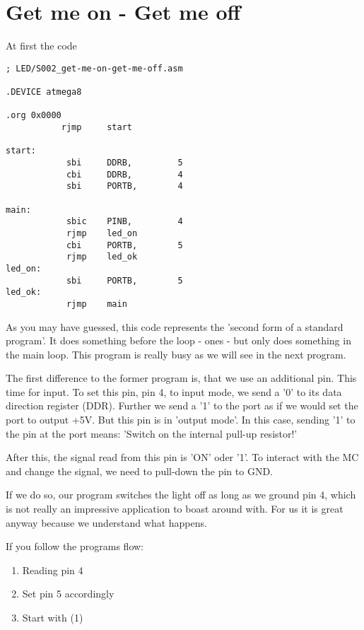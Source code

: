 \section{Get me on - Get me off}

At first the code


\begin{lstlisting}
; LED/S002_get-me-on-get-me-off.asm

.DEVICE atmega8

.org 0x0000
           rjmp     start

start:
            sbi     DDRB,         5
            cbi     DDRB,         4
            sbi     PORTB,        4

main:
            sbic    PINB,         4
            rjmp    led_on
            cbi     PORTB,        5
            rjmp    led_ok
led_on:
            sbi     PORTB,        5
led_ok:
            rjmp    main
\end{lstlisting}

As you may have guessed, this code represents the 'second form of a standard program'. It does something before the loop - ones - but only does something in the main loop. This program is really busy as we will see in the next program.

The first difference to the former program is, that we use an additional pin. This time for input. To set this pin, pin 4, to input mode, we send a '0' to its data direction register (DDR). Further we send a '1' to the port as if we would set the port to output +5V. But this pin is in 'output mode'. In this case, sending '1' to the pin at the port means: 'Switch on the internal pull-up resistor!'

After this, the signal read from this pin is 'ON' oder '1'. To interact with the MC and change the signal, we need to pull-down the pin to GND.

If we do so, our program switches the light off as long as we ground pin 4, which is not really an impressive application to boast around with. For us it is great anyway because we understand what happens.

If you follow the programs flow:

\begin{enumerate}
  \item Reading pin 4
  \item Set pin 5 accordingly
  \item Start with (1)
\end{enumerate}

